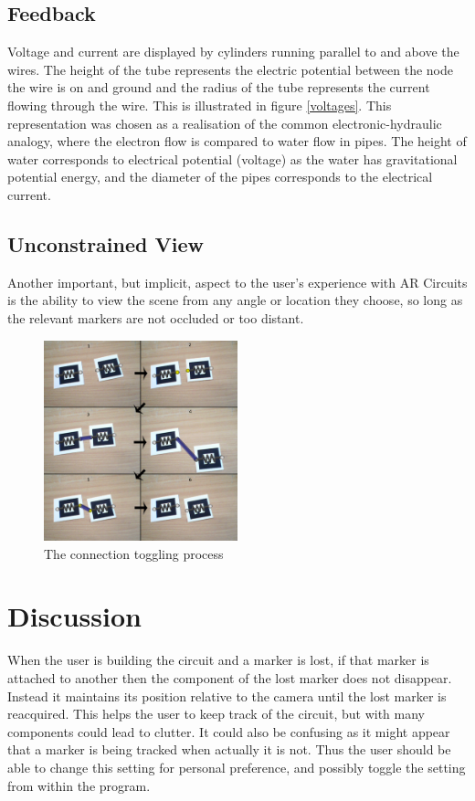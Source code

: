 \subsection{Feedback}
Voltage and current are displayed by cylinders running parallel to and above
the wires. The height of the tube represents the electric potential between the
node the wire is on and ground and the radius of the tube represents the current
flowing through the wire. This is illustrated in figure \ref{voltages}. This 
representation was chosen as a realisation of the common electronic-hydraulic
analogy, where the electron flow is compared to water flow in pipes. The height
of water corresponds to electrical potential (voltage) as the water has gravitational
potential energy, and the diameter of the pipes corresponds to the electrical
current.


\subsection{Unconstrained View}
Another important, but implicit, aspect to the
user's experience with AR Circuits is the ability to view the scene from any
angle or location they choose, so long as the relevant markers are not occluded
or too distant.

\begin{figure}
\begin{center}
\includegraphics[width=0.50\textwidth]{connection}
\end{center}
\caption{The connection toggling process}
\label{connection}
\end{figure}

\section{Discussion}

When the user is building the circuit and a marker is lost, if that marker is attached to another then the component of the lost marker does not disappear. Instead it maintains its position relative to the camera until the lost marker is reacquired. This helps the user to keep track of the circuit, but with many components could lead to clutter. It could also be confusing as it might appear that a marker is being tracked when actually it is not. Thus the user should be able to change this setting for personal preference, and possibly toggle the setting from within the program.

